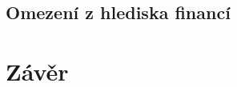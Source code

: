 \documentclass[12pt]{article}
\begin{document}
\begin{sloppypar}
\begin{spacing}{1.15}
        \subsection*{Omezení z hlediska financí}

        \section*{Závěr}

	\end{spacing}
    \end{sloppypar}
\end{document}

